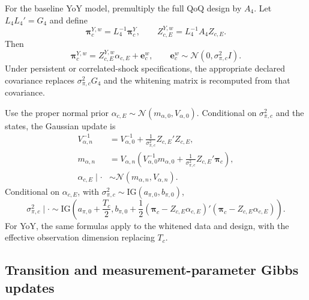 \documentclass[11pt]{article}
\newcommand{\Normal}{\mathcal{N}}
\begin{document}
For the baseline YoY model, premultiply the full QoQ design by $A_4$. Let $L_4L_4'=G_4$ and define
\begin{equation}
\bm\pi_c^{Y,w}=L_4^{-1}\bm\pi_c^Y,
\qquad
Z_{c,E}^{Y,w}=L_4^{-1}A_4Z_{c,E}.
\end{equation}
Then
\begin{equation}
\bm\pi_c^{Y,w}=Z_{c,E}^{Y,w}\alpha_{c,E}+\bm e_c^w,
\qquad
\bm e_c^w\sim\Normal(0,\sigma_{\pi,c}^2I).
\end{equation}
Under persistent or correlated-shock specifications, the appropriate declared covariance replaces $\sigma_{\pi,c}^2G_4$ and the whitening matrix is recomputed from that covariance.

Use the proper normal prior $\alpha_{c,E}\sim\Normal(m_{\alpha,0},V_{\alpha,0})$. Conditional on $\sigma_{\pi,c}^2$ and the states, the Gaussian update is
\begin{align}
V_{\alpha,n}^{-1}
&=V_{\alpha,0}^{-1}+\frac{1}{\sigma_{\pi,c}^2}Z_{c,E}'Z_{c,E},\\
m_{\alpha,n}
&=V_{\alpha,n}\left(V_{\alpha,0}^{-1}m_{\alpha,0}+\frac{1}{\sigma_{\pi,c}^2}Z_{c,E}'\bm\pi_c\right),\\
\alpha_{c,E}\mid\cdot&\sim\Normal(m_{\alpha,n},V_{\alpha,n}).
\end{align}
Conditional on $\alpha_{c,E}$, with $\sigma_{\pi,c}^2\sim\mathrm{IG}(a_{\pi,0},b_{\pi,0})$,
\begin{equation}
\sigma_{\pi,c}^2\mid\cdot
\sim
\mathrm{IG}\!\left(a_{\pi,0}+\frac{T_c}{2},
b_{\pi,0}+\frac12(\bm\pi_c-Z_{c,E}\alpha_{c,E})'(\bm\pi_c-Z_{c,E}\alpha_{c,E})\right).
\end{equation}
For YoY, the same formulas apply to the whitened data and design, with the effective observation dimension replacing $T_c$.

\subsection{Transition and measurement-parameter Gibbs updates}
\end{document}
